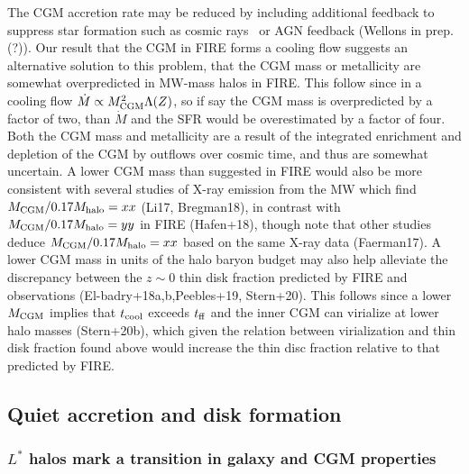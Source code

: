 \documentclass[fleqn,usenatbib]{mnras}
\newcommand{\Mdot}{\dot{M}}
\begin{document}
The CGM accretion rate may be reduced by including additional feedback to suppress star formation such as cosmic rays~\citep{Chan2019, Hopkins2020, Hopkins2020a, Hopkins2020b}
or AGN feedback (Wellons in prep.(?)). 
Our result that the CGM in FIRE forms a cooling flow suggests an alternative solution to this problem, that the CGM mass or metallicity are somewhat overpredicted in MW-mass halos in FIRE.
This follow since in a cooling flow $\Mdot\propto M_{\rm CGM}^2 \Lambda(Z)$, so if say the CGM mass is overpredicted by a factor of two, than $\Mdot$ and the SFR would be overestimated by a factor of four.
Both the CGM mass and metallicity are a result of the integrated enrichment and depletion of the CGM by outflows over cosmic time, and thus are somewhat uncertain. %
A lower CGM mass than suggested in FIRE would also be more consistent with several studies of X-ray emission from the MW which find $M_{\rm CGM}/0.17M_{\rm halo}=xx$ (Li17, Bregman18), in contrast with $M_{\rm CGM}/0.17M_{\rm halo}=yy$ in FIRE (Hafen+18), though note that other studies deduce $M_{\rm CGM}/0.17M_{\rm halo}=xx$ based on the same X-ray data (Faerman17).
A lower CGM mass in units of the halo baryon budget may also help alleviate the discrepancy between the $z\sim0$ thin disk fraction predicted by FIRE and observations (El-badry+18a,b,Peebles+19, Stern+20).
This follows since a lower $M_{\rm CGM}$ implies that $t_{\rm cool}$ exceeds $t_{\rm ff}$ and the inner CGM can virialize at lower halo masses (Stern+20b), which given the relation between virialization and thin disk fraction found above would increase the thin disc fraction relative to that predicted by FIRE. 

\subsection{Quiet accretion and disk formation}
\label{s: disk formation}

\subsubsection{$L^*$ halos mark a transition in galaxy and CGM properties}
\label{s: disk formation -- transition}
\end{document}
